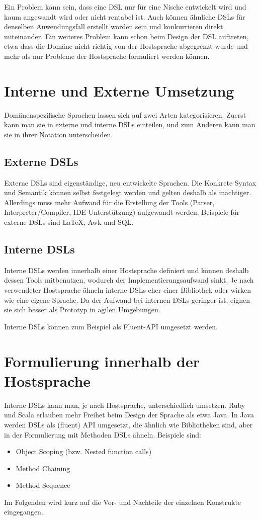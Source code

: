 \documentclass[../InterneDSLs.tex]{subfiles}
\begin{document}
Ein Problem kann sein, dass eine DSL nur für eine Nische entwickelt wird und kaum angewandt wird oder nicht rentabel ist. Auch können ähnliche DSLs für denselben Anwendungsfall erstellt worden sein und konkurrieren direkt miteinander. Ein weiteres Problem kann schon beim Design der DSL auftreten, etwa dass die Domäne nicht richtig von der Hostsprache abgegrenzt wurde und mehr als nur Probleme der Hostsprache formuliert werden können.


\section{Interne und Externe Umsetzung}
Domänenspezifische Sprachen lassen sich auf zwei Arten kategorisieren. Zuerst kann man sie in externe und interne DSLs einteilen, und zum Anderen kann man sie in ihrer Notation unterscheiden.

\subsection{Externe DSLs}
Externe DSLs sind eigenständige, neu entwickelte Sprachen. Die Konkrete Syntax und Semantik können selbst festgelegt werden und gelten deshalb als mächtiger. Allerdings muss mehr Aufwand für die Erstellung der Tools (Parser, Interpreter/Compiler, \acs{IDE}-Unterstützung) aufgewandt werden. Beispiele für externe DSLs sind LaTeX, Awk und SQL.

\subsection{Interne DSLs}
Interne DSLs werden innerhalb einer Hostsprache definiert und können deshalb dessen Tools mitbenutzen, wodurch der Implementierungsaufwand sinkt. Je nach verwendeter Hostsprache ähneln interne DSLs eher einer Bibliothek oder wirken wie eine eigene Sprache. Da der Aufwand bei internen DSLs geringer ist, eignen sie sich besser als Prototyp in agilen Umgebungen.~\cite{butting2018deriving}

Interne DSLs können zum Beispiel als Fluent-\acs{API} umgesetzt werden.


\section{Formulierung innerhalb der Hostsprache}
Interne DSLs kann man, je nach Hostsprache, unterschiedlich umsetzen. Ruby und Scala erlauben mehr Freihet beim Design der Sprache als etwa Java. In Java werden DSLs als (fluent) API umgesetzt, die ähnlich wie Bibliotheken sind, aber in der Formulierung mit Methoden DSLs ähneln. Beispiele sind:
\begin{itemize}
	\item Object Scoping (bzw. Nested function calls)
	\item Method Chaining
	\item Method Sequence
\end{itemize}
Im Folgenden wird kurz auf die Vor- und Nachteile der einzelnen Konstrukte eingegangen.
\end{document}
